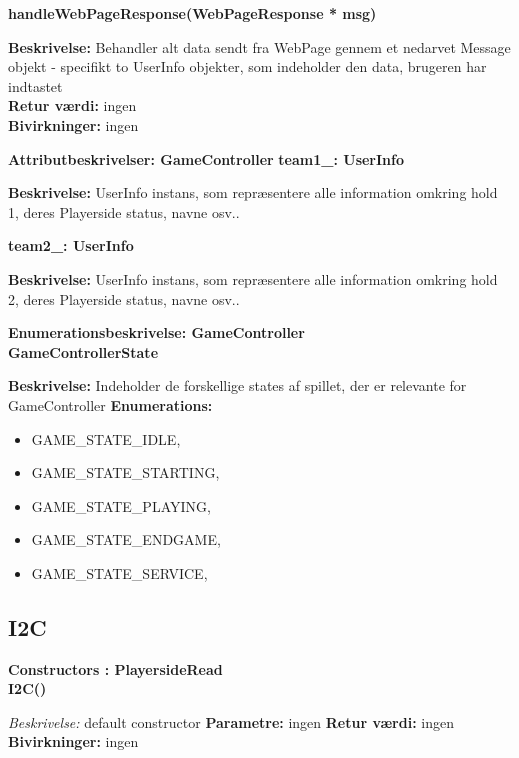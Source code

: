 \documentclass[Softwaredesign/Softwaredesign_main.tex]{subfiles}
\begin{document}
\textbf{handleWebPageResponse(WebPageResponse * msg)}
\begin{adjustwidth}{1cm}{0pt}
\textbf{Beskrivelse:} Behandler alt data sendt fra WebPage gennem et nedarvet Message objekt - specifikt to UserInfo objekter, som indeholder den data, brugeren har indtastet\\[0.2cm]
\textbf{Retur værdi:} ingen \\[0.2cm]
\textbf{Bivirkninger:} ingen  \\[0.2cm]
\end{adjustwidth}

{\large\textbf{Attributbeskrivelser: GameController}}
\textbf{team1\_: UserInfo } 
\begin{adjustwidth}{1cm}{0pt}
\textbf{Beskrivelse:} UserInfo instans, som repræsentere alle information omkring hold 1, deres Playerside status, navne osv.. \\[0.2cm]
\end{adjustwidth}

\textbf{team2\_: UserInfo } 
\begin{adjustwidth}{1cm}{0pt}
\textbf{Beskrivelse:} UserInfo instans, som repræsentere alle information omkring hold 2, deres Playerside status, navne osv.. \\[0.2cm]
\end{adjustwidth}

{\large\textbf{Enumerationsbeskrivelse: GameController}}\\[0.2cm]
\textbf{GameControllerState}
\begin{adjustwidth}{1cm}{0pt}
\textbf{Beskrivelse:} Indeholder de forskellige states af spillet, der er relevante for GameController 
\textbf{Enumerations:}
\begin{itemize}
    \item GAME\_STATE\_IDLE,
	\item GAME\_STATE\_STARTING,
	\item GAME\_STATE\_PLAYING,
	\item GAME\_STATE\_ENDGAME,
	\item GAME\_STATE\_SERVICE,
\end{itemize}
\end{adjustwidth}

\subsection{I2C}
{\large\textbf{Constructors : PlayersideRead}}\\[0.2cm]
\textbf{I2C()}
\begin{adjustwidth}{1cm}{0pt}
\textit{Beskrivelse:} default constructor
\textbf{Parametre:} ingen
\textbf{Retur værdi:} ingen \\[0.2cm]
\textbf{Bivirkninger:} ingen \\[0.2cm]
\end{adjustwidth}
\end{document}
